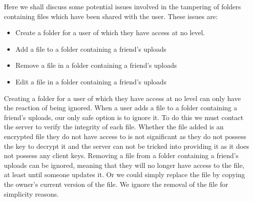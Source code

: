 \documentclass[12pt, titlepage]{article}
\begin{document}
\newline
\newline \indent Here we shall discuss some potential issues involved in the tampering of folders containing files which have been shared with the user. These issues are:
\begin{itemize}
	\item Create a folder for a user of which they have access at no level.
	\item Add a file to a folder containing a friend's uploads
	\item Remove a file in a folder containing a friend's uploads
	\item Edit a file in a folder containing a friend's uploads
\end{itemize}
Creating a folder for a user of which they have access at no level can only have the reaction of being ignored.
\newline \indent When a user adds a file to a folder containing a friend's uploads, our only safe option is to ignore it. To do this we must contact the server to verify the integrity of each file. Whether the file added is an encrypted file they do not have access to is not significant as they do not possess the key to decrypt it and the server can not be tricked into providing it as it does not possess any client keys.
\newline \indent Removing a file from a folder containing a friend's uploads can be ignored, meaning that they will no longer have access to the file, at least until someone updates it. Or we could simply replace the file by copying the owner's current version of the file. We ignore the removal of the file for simplicity reasons.

\newpage
\end{document}

